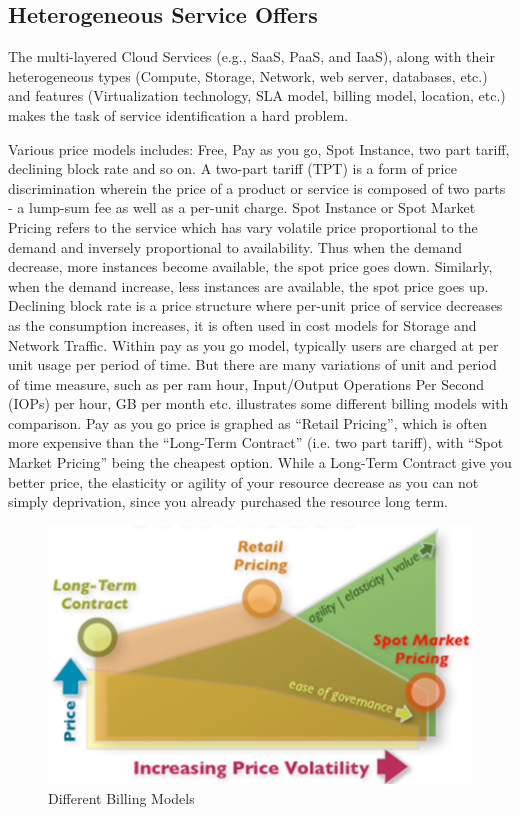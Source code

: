 \subsection{Heterogeneous Service Offers}
\label{subsec:HeterogeneousServiceOffers}
The multi-layered Cloud Services (e.g., SaaS,
PaaS, and IaaS), along with their
heterogeneous types (Compute, Storage, Network, web server,
databases, etc.) and features (Virtualization technology, SLA
model, billing model, location, etc.) makes the
task of service identification a hard problem.

Various price models includes: Free, Pay as you go, Spot Instance, two part tariff, declining block rate and so on.
A two-part tariff (TPT) is a form of price discrimination wherein the price of a product or service is composed of two parts - a lump-sum fee as well as a per-unit charge. 
Spot Instance or Spot Market Pricing refers to the service which has vary volatile price proportional
to the demand and inversely proportional to availability. Thus when the demand decrease, more instances become available, the spot price goes down. Similarly, when the demand increase, less instances are available, the spot price goes up.
Declining block rate is a price structure where per-unit price of service decreases as the consumption increases, it is often used in cost models for Storage and Network Traffic.
Within pay as you go model, typically users are charged at per unit usage per period of time.
But there are many variations of unit and period of time measure, such as per ram hour, Input/Output Operations Per Second (IOPs) per hour, GB per month etc.
 illustrates some different billing models with comparison.
Pay as you go price is graphed as \enquote{Retail Pricing}, which is often more expensive than the
\enquote{Long-Term Contract} (i.e. two part tariff), with \enquote{Spot Market Pricing} 
being the cheapest option.
While a Long-Term Contract give you better price, the elasticity or agility of your resource decrease as you can not simply deprivation, since you already purchased the resource long term.

\begin{figure}[ht]
  \includegraphics[width=\textwidth]{Figures/intro/cloud_price_models.png}
  \caption{Different Billing Models \cite{cloud_cost_models_figure}}
  \label{fig:DifferentBillingModels}
\end{figure}

